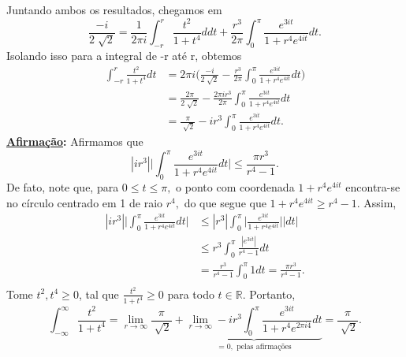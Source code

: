 \documentclass[complex.tex]{subfiles}
\begin{document}
\begin{exer*}
	Juntando ambos os resultados, chegamos em
	\[
		\frac{-i}{2\sqrt[]{2}} = \frac{1}{2\pi i}\int_{-r}^{r}\frac{t^{2}}{1+t^{4}}ddt + \frac{r^{3}}{2\pi }\int_{0}^{\pi }\frac{e^{3it}}{1 + r^{4}e^{4it}}dt.
	\]
	Isolando isso para a integral de -r até r, obtemos
	\begin{align*}
		\int_{-r}^{r}\frac{t^{2}}{1+t^{4}}dt & = 2\pi i \biggl(\frac{-i}{2\sqrt[]{2}} - \frac{r^{3}}{2\pi }\int_{0}^{\pi }\frac{e^{3it}}{1 + r^{4}e^{4it}}dt\biggr) \\
		                                     & = \frac{2\pi }{2\sqrt[]{2}} - \frac{2\pi ir^{3}}{2\pi }\int_{0}^{\pi }\frac{e^{3it}}{1 + r^{4}e^{4it}}dt             \\
		                                     & = \frac{\pi }{\sqrt[]{2}} - ir^{3}\int_{0}^{\pi }\frac{e^{3it}}{1+r^{4}e^{4it}}dt.
	\end{align*}
	\textbf{\underline{Afirmação}:} Afirmamos que
	\[
		|ir^{3}|\biggl\vert \int_{0}^{\pi }\frac{e^{3it}}{1+ r^{4}e^{4it}}dt \biggr\vert \leq \frac{\pi r^{3}}{r^{4}-1}.
	\]
	De fato, note que, para \(0\leq t\leq \pi ,\) o ponto com coordenada \(1 + r^{4}e^{4it}\) encontra-se no círculo centrado em 1 de raio \(r^{4},\) do que
	segue que \(1 + r^{4}e^{4it} \geq r^{4}-1.\) Assim,
	\begin{align*}
		|ir^{3}|\biggl\vert \int_{0}^{\pi }\frac{e^{3it}}{1+r^{4}e^{4it}}dt \biggr\vert & \leq |r^{3}|\int_{0}^{\pi }\biggl\vert \frac{e^{3it}}{1+r^{4}e^{4it}} \biggr\vert|dt| \\
		                                                                                & \leq r^{3}\int_{0}^{\pi }\frac{|e^{3it}|}{r^{4}-1}dt                                  \\
		                                                                                & = \frac{r^{3}}{r^{4}-1}\int_{0}^{\pi }1dt = \frac{\pi r^{3}}{r^{4} - 1}.              \\
	\end{align*}
	Tome \(t^{2}, t^{4}\geq 0\), tal que \(\frac{t^{2}}{1 + t^{4}} \geq 0\) para todo \(t\in \mathbb{R}.\) Portanto,
	\[
		\int_{-\infty}^{\infty}\frac{t^{2}}{1+t^{4}}=\lim_{r\to \infty}\frac{\pi }{\sqrt[]{2}} + \underbrace{\lim_{r\to \infty}-ir^{3}\int_{0}^{\pi }\frac{e^{3it}}{1 + r^{4}e^{2\pi i4}}dt}_{= 0, \text{ pelas afirmações}} = \frac{\pi }{\sqrt[]{2}}.
	\]
\end{exer*}
\end{document}
